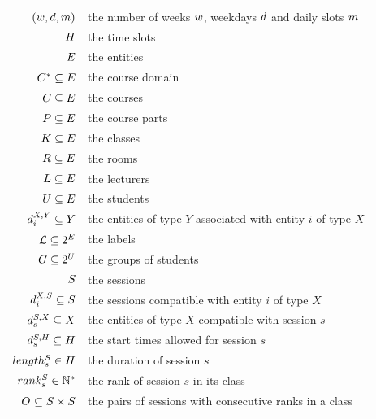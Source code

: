 \begin{table}[ht]
\begin{center}
\begin{tabular}{|rl|}
\hline
$(w,d,m)$               & the number of weeks $w$, weekdays $d$ and daily slots $m$
\\
$H$                                     & the time slots 
\\\hline
$E$                                   & the entities
\\
$C^{*}\subseteq E$                  & the course domain
\\
$C\subseteq E$                   & the courses
\\
$P\subseteq E$                     & the course parts
\\
$K\subseteq E$                    & the classes
\\
$R\subseteq E$                     & the rooms
\\
$L\subseteq E$                  & the lecturers
\\
$U\subseteq E$                  & the students
\\
$d^{X,Y}_{i}\subseteq{Y}$                 & the entities of type $Y$ associated with entity $i$ of type $X$
\\\hline
${\mathcal{L}}\subseteq2^{{E}}$            & the labels
\\\hline
$G\subseteq{2^{U}}$             & the groups of students
\\\hline
$S$                                  & the sessions
\\
$d^{X,S}_{i}\subseteq{S}$   & the sessions compatible with entity $i$ of type $X$
\\
$d^{S,X}_{s}\subseteq{X}$          & the entities of type $X$ compatible with session $s$
\\
$d^{S,H}_{s}\subseteq{H}$      & the start times allowed for session $s$
\\
$length^{S}_{s}\in{H}$             & the duration of session $s$
\\
$rank^{S}_{s}\in{\mathbb{N}^*}$            & the rank of session $s$ in its class
\\
$O^{}_{}\subseteq{S\times S}$ & the pairs of sessions with consecutive ranks in a class

\end{tabular}
\end{center}
\end{table}
